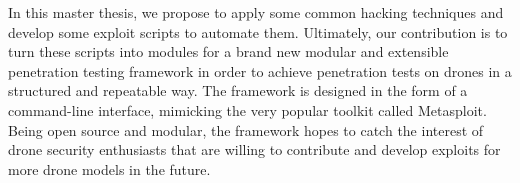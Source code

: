 \begin{center}
\begin{minipage}{15cm}
In this master thesis, we propose to apply some common hacking techniques and develop some exploit scripts to automate them. Ultimately, our contribution is to turn these scripts into modules for a brand new modular and extensible penetration testing framework in order to achieve penetration tests on drones in a structured and repeatable way. The framework is designed in the form of a command-line interface, mimicking the very popular toolkit called Metasploit. Being open source and modular, the framework hopes to catch the interest of drone security enthusiasts that are willing to contribute and develop exploits for more drone models in the future. 
\end{minipage}
\end{center}

\vfill
